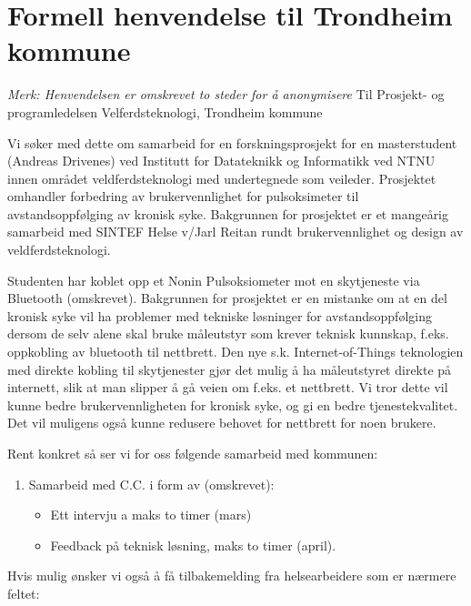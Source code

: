\chapter{Formell henvendelse til Trondheim kommune}
\label{appendix:formell}
\textit{Merk: Henvendelsen er omskrevet to steder for å anonymisere}\newline
Til Prosjekt- og programledelsen Velferdsteknologi, Trondheim kommune

Vi søker med dette om samarbeid for en forskningsprosjekt for en masterstudent (Andreas Drivenes) ved Institutt for Datateknikk og Informatikk ved
NTNU innen området veldferdsteknologi med undertegnede som veileder. Prosjektet omhandler forbedring av brukervennlighet for pulsoksimeter til
avstandsoppfølging av kronisk syke. Bakgrunnen for prosjektet er et mangeårig samarbeid med SINTEF Helse v/Jarl Reitan rundt brukervennlighet og
design av veldferdsteknologi.

Studenten har koblet opp et Nonin Pulsoksiometer mot en skytjeneste via
Bluetooth (omskrevet). Bakgrunnen for prosjektet er en mistanke om at en del kronisk syke vil ha problemer med tekniske løsninger for avstandsoppfølging dersom
de selv alene skal bruke måleutstyr som krever teknisk kunnskap, f.eks. oppkobling av bluetooth til nettbrett. Den nye s.k. Internet-of-Things
teknologien med direkte kobling til skytjenester gjør det mulig å ha måleutstyret direkte på internett, slik at man slipper å gå veien om f.eks. et
nettbrett. Vi tror dette vil kunne bedre brukervennligheten for kronisk syke, og gi en bedre tjenestekvalitet. Det vil muligens også kunne redusere
behovet for nettbrett for noen brukere.

Rent konkret så ser vi for oss følgende samarbeid med kommunen:

\begin{enumerate}
\def\labelenumi{\arabic{enumi}.}
\tightlist
\item
    Samarbeid med C.C. i form av (omskrevet):

  \begin{itemize}
  \tightlist
  \item
    Ett intervju a maks to timer (mars)
  \item
    Feedback på teknisk løsning, maks to timer (april).
  \end{itemize}
\end{enumerate}

Hvis mulig ønsker vi også å få tilbakemelding fra helsearbeidere som er
nærmere feltet:

